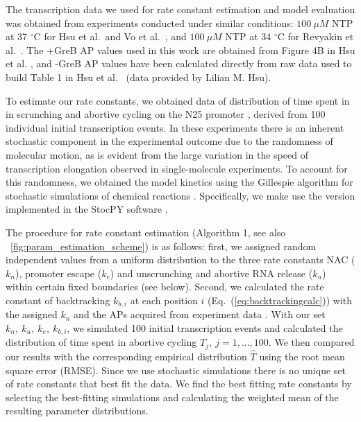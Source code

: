 The transcription data we used for rate constant estimation and model
evaluation was obtained from experiments conducted under similar conditions:
$100\ \mu M$ NTP at 37 $^{\circ}$C for Hsu et al.\ and Vo et al.\
\cite{hsu_initial_2006,vo_vitro_2003-1}, and $100\ \mu M$ NTP at 34 $^{\circ}$C
for Revyakin et al.\ \cite{revyakin_abortive_2006}. The +GreB AP values used in
this work are obtained from Figure 4B in Hsu et al.  \cite{hsu_initial_2006},
and -GreB AP values have been calculated directly from raw data used to build
Table 1 in Hsu et al.\ \cite{hsu_initial_2006} (data provided by Lilian M.
Hsu).



To estimate our rate constants, we obtained data of distribution of time spent
in in scrunching and abortive cycling on the N25 promoter
\cite{revyakin_abortive_2006}, derived from 100 individual initial
transcription events. In these experiments there is an inherent stochastic
component in the experimental outcome due to the randomness of molecular
motion, as is evident from the large variation in the speed of transcription
elongation observed in single-molecule experiments\cite{adelman_single_2002,
tolic-norrelykke_diversity_2004}. To account for this randomness, we obtained
the model kinetics using the Gillespie algorithm for stochastic simulations of
chemical reactions \cite{gillespie_exact_1977}. Specifically, we make use the
version implemented in the StocPY software \cite{maarleveld_stochpy:_2013}.

The procedure for rate constant estimation (Algorithm 1, see also
\FIG~\ref{fig:param_estimation_scheme}) is as follows: first, we assigned
random independent values from a uniform distribution to the three rate
constants NAC ($k_n$), promoter escape ($k_e$) and unscrunching and abortive
RNA release ($k_u$) within certain fixed boundaries (see below). Second,
we calculated the rate constant of backtracking $k_{b,i}$ at each position
$i$ (Eq.~(\ref{eq:backtrackingcalc})) with the assigned $k_n$ and the APs 
acquired from experiment data \cite{hsu_initial_2006}. With our set ${k_n,\
k_u,\ k_e,\ k_{b,i}}$, we simulated 100 initial transcription events and
calculated the distribution of time spent in abortive cycling $T_j,\
j=1,...,100$. We then compared our results with the corresponding empirical
distribution $\hat T$ \cite{revyakin_abortive_2006} using the root mean
square error (RMSE). Since we use stochastic simulations there is no unique
set of rate constants that best fit the data. We find the best fitting rate
constants by selecting the best-fitting simulations and calculating the
weighted mean of the resulting parameter distributions.

